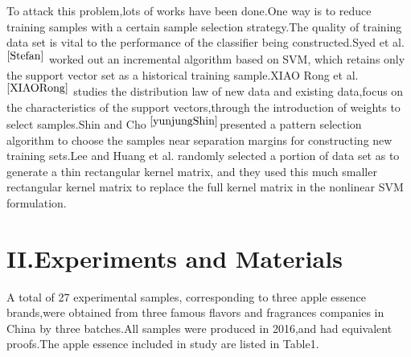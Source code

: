 \documentclass[a4paper]{article}
\begin{document}
To attack this problem,lots of works have been done.One way is to reduce training samples with a certain sample selection strategy.The quality of training data set is vital to the performance of the classifier being constructed.Syed et al.$ ^{\cite{Stefan}}$ worked out an incremental algorithm based on SVM, which retains only the support vector set as a historical training sample.XIAO Rong et al. $ ^{\cite{XIAORong}}$ studies the distribution law of new data and existing data,focus on  the characteristics of the support vectors,through the introduction of weights to select samples.Shin and Cho $^{\cite{yunjungShin}}$presented a pattern selection algorithm to choose the samples near separation margins for constructing new training sets.Lee and Huang et al. \cite{YJLee} randomly selected a portion of data set as to generate a thin rectangular kernel matrix, and they used this much smaller rectangular kernel matrix to replace the full kernel matrix in the nonlinear SVM formulation.

\section{II.Experiments and Materials}
A total of 27 experimental samples, corresponding to three apple essence brands,were obtained from three famous flavors and fragrances companies in China by three batches.All samples were produced in 2016,and had equivalent proofs.The apple essence included in study are listed in Table1.
\end{document}
